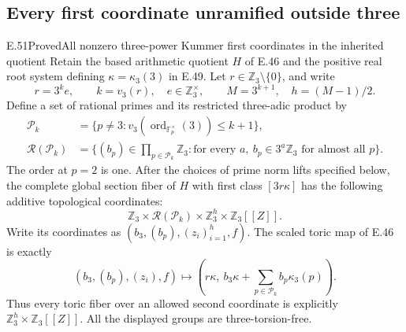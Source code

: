 \subsection{Every first coordinate unramified outside three}

\begin{statement}{E.51}{Proved}{All nonzero three-power Kummer first coordinates in the inherited quotient}
Retain the based arithmetic quotient $H$ of E.46 and the
positive real root system defining $\kappa=\kappa_3(3)$ in
E.49. Let $r\in\mathbb Z_3\setminus\{0\}$, and write
\[
 r=3^k e,\qquad k=v_3(r),\quad e\in\mathbb Z_3^\times,
 \qquad M=3^{k+1},\quad h=(M-1)/2.
 \tag{E51.1}
\]
Define a set of rational primes and its restricted
three-adic product by
\[
 \begin{split}
 \mathscr P_k&=\{p\ne3:
       v_3(\operatorname{ord}_{\mathbb F_p^\times}(3))
                                                \le k+1\},\\
 \mathcal R(\mathscr P_k)&=
 \{(b_p)\in\prod_{p\in\mathscr P_k}\mathbb Z_3:
       \text{for every }a,\ b_p\in3^a\mathbb Z_3
                       \text{ for almost all }p\}.
 \end{split}                                                   \tag{E51.2}
\]
The order at $p=2$ is one. After the choices of
prime norm lifts specified below, the complete global
section fiber of $H$ with first class $[3r\kappa]$
has the following additive topological coordinates:
\[
 \boxed{\quad
 \mathbb Z_3\times\mathcal R(\mathscr P_k)
                 \times\mathbb Z_3^{h}\times\mathbb Z_3[[Z]].
 \quad}                                                        \tag{E51.3}
\]
Write its coordinates as $(b_3,(b_p),(z_i)_{i=1}^h,f)$.
The scaled toric map of E.46 is exactly
\[
 (b_3,(b_p),(z_i),f)\longmapsto
 \left(r\kappa,\ b_3\kappa+
                         \sum_{p\in\mathscr P_k}b_p\kappa_3(p)\right).
 \tag{E51.4}
\]
Thus every toric fiber over an allowed second coordinate
is explicitly $\mathbb Z_3^h\times\mathbb Z_3[[Z]]$.
All the displayed groups are three-torsion-free.


\end{statement}
